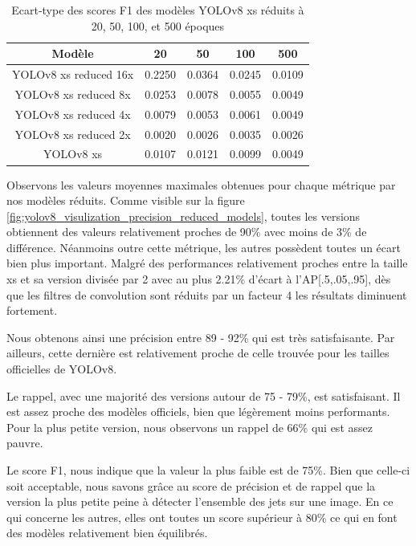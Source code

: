 \begin{table}[!ht]
    \caption{Ecart-type des scores F1 des modèles YOLOv8 xs réduits à 20, 50, 100, et 500 époques}
    \label{tab:std_f1_scores_yolov8_reduced_models}
    \centering
    \begin{tabular}{ |c||c|c|c|c|  }
        \hline
        \rowcolor{gray!50}
        Modèle & 20 & 50 & 100 & 500\\
        \hline
        YOLOv8 xs reduced 16x & 0.2250 & 0.0364 & 0.0245 & 0.0109\\
        YOLOv8 xs reduced 8x & 0.0253 & 0.0078 & 0.0055 & 0.0049\\
        YOLOv8 xs reduced 4x & 0.0079 & 0.0053 & 0.0061 & 0.0049\\
        YOLOv8 xs reduced 2x & 0.0020 & 0.0026 & 0.0035  & 0.0026\\
        YOLOv8 xs & 0.0107 & 0.0121 & 0.0099 & 0.0049\\
        \hline
    \end{tabular}
\end{table}

\break

Observons les valeurs moyennes maximales obtenues pour chaque métrique par nos modèles réduits. Comme visible sur la figure \ref{fig:yolov8_visulization_precision_reduced_models}, toutes les versions obtiennent des valeurs relativement proches de 90\% avec moins de 3\% de différence. Néanmoins outre cette métrique, les autres possèdent toutes un écart bien plus important. Malgré des performances relativement proches entre la taille xs et sa version divisée par 2 avec au plus 2.21\% d'écart à l'AP[.5,.05,.95], dès que les filtres de convolution sont réduits par un facteur 4 les résultats diminuent fortement.

Nous obtenons ainsi une précision entre 89 - 92\% qui est très satisfaisante. Par ailleurs, cette dernière est relativement proche de celle trouvée pour les tailles officielles de YOLOv8.

Le rappel, avec une majorité des versions autour de 75 - 79\%, est satisfaisant. Il est assez proche des modèles officiels, bien que légèrement moins performants. Pour la plus petite version, nous observons un rappel de 66\% qui est assez pauvre.

Le score F1, nous indique que la valeur la plus faible est de 75\%. Bien que celle-ci soit acceptable, nous savons grâce au score de précision et de rappel que la version la plus petite peine à détecter l'ensemble des jets sur une image. En ce qui concerne les autres, elles ont toutes un score supérieur à 80\% ce qui en font des modèles relativement bien équilibrés.

